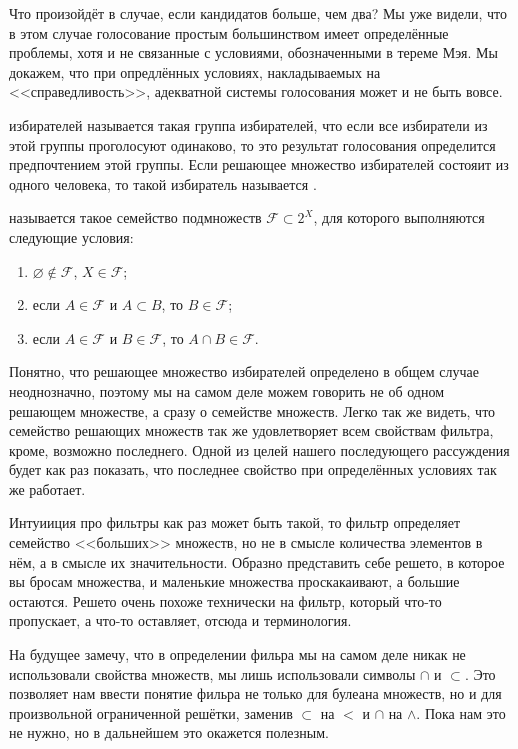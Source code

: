 Что произойдёт в случае, если кандидатов больше, чем два? Мы уже видели, что в этом случае голосование простым большинством имеет определённые проблемы, хотя и не связанные с условиями, обозначенными в тереме Мэя. Мы докажем, что при опредлённых условиях, накладываемых на <<справедливость>>, адекватной системы голосования может и не быть вовсе.

\begin{definition}
 избирателей называется такая группа избирателей, что если все избиратели из этой группы проголосуют одинаково, то это результат голосования определится предпочтением этой группы. Если решающее множество избирателей состояит из одного человека, то такой избиратель называется .
\end{definition}

\begin{definition}
 называется такое семейство подмножеств $\mathcal{F}\subset 2^X$, для которого выполняются следующие условия:
\begin{enumerate}
\item $\varnothing \not\in \mathcal{F}$, $X\in\mathcal{F}$;
\item если $A\in\mathcal{F}$ и $A\subset B$, то $B\in \mathcal{F}$;
\item если $A\in\mathcal{F}$ и $B\in\mathcal{F}$, то $A\cap B\in\mathcal{F}$.
\end{enumerate}
\end{definition}

Понятно, что решающее множество избирателей определено в общем случае неоднозначно, поэтому мы на самом деле можем говорить не об одном решающем множестве, а сразу о семействе множеств. Легко так же видеть, что семейство решающих множеств так же удовлетворяет всем свойствам фильтра, кроме, возможно последнего. Одной из целей нашего последующего рассуждения будет как раз показать, что последнее свойство при определённых условиях так же работает.

Интуииция про фильтры как раз может быть такой, то фильтр определяет семейство <<больших>> множеств, но не в смысле количества элементов в нём, а в смысле их значительности. Образно представить себе решето, в которое вы бросам множества, и маленькие множества проскакаивают, а большие остаются. Решето очень похоже технически на фильтр, который что-то пропускает, а что-то оставляет, отсюда и терминология.

На будущее замечу, что в определении фильра мы на самом деле никак не использовали свойства множеств, мы лишь использовали символы $\cap$ и $\subset$. Это позволяет нам ввести понятие фильра не только для булеана множеств, но и для произвольной ограниченной решётки, заменив $\subset$ на $<$ и $\cap$ на $\land$. Пока нам это не нужно, но в дальнейшем это окажется полезным.

